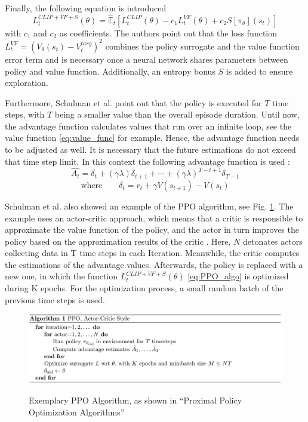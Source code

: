 Finally, the following equation is introduced
\begin{equation}\label{eq:PPO_algo}
    L_{t}^{CLIP+VF+S}(\theta) = \hat{\mathbb{E}}_{t} \left[ L_{t}^{CLIP}(\theta) - c_{1}L_{t}^{VF}(\theta) + c_{2}S[\pi_{\theta}](s_{t}) \right]
\end{equation}
with $c_{1}$ and $c_{2}$ as coefficients. The authors point out that the loss function \\
$L_{t}^{VF} = (V_{\theta}(s_{t})-V_{t}^{targ})^2$ combines the policy surrogate and the value function error term and is necessary once a neural network shares parameters between policy and value function. Additionally, an entropy bonus $S$ is added to ensure exploration.

Furthermore, Schulman et al. point out that the policy is executed for $T$ time steps, with $T$ being a smaller value than the overall episode duration. Until now, the advantage function calculates values that run over an infinite loop, see the value function \eqref{eq:value_func} for example. Hence, the advantage function needs to be adjusted as well. It is necessary that the future estimations do not exceed that time step limit. In this context the following advantage function is used \cite{scwo17}:
\begin{equation}\label{eq:advantage_func}
    \hat{A_t} = \delta_t+(\gamma \lambda)\delta_{t+1}+ \cdots + (\gamma \lambda)^{T-t+1}\delta_{T-1}
\end{equation}
\begin{equation}\label{eq:advantage_func_delta}
    \textrm{where} \qquad \delta_t = r_t + \gamma V(s_{t+1}) - V(s_t)
\end{equation}

Schulman et al. also showed an example of the PPO algorithm, see Fig. \ref{fig:ppo_algo_code}. The example uses an actor-critic approach, which means that a critic is responsible to approximate the value function of the policy, and the actor in turn improves the policy based on the approximation results of the critic \cite{kots03}. Here, $N$ detonates actors collecting data in T time steps in each Iteration. Meanwhile, the critic computes the estimations of the advantage values. Afterwards, the policy is replaced with a new one, in which the function $L_{t}^{CLIP+VF+S}(\theta)$ \eqref{eq:PPO_algo} is optimized during K epochs. For the optimization process, a small random batch of the previous time steps is used.
\begin{figure}[hpbt]
    \centering
    \includegraphics[width=1\textwidth]{pictures/ppo_algo_code.png}\\
    \caption[Exemplary PPO Algorithm]{Exemplary PPO Algorithm, as shown in ``Proximal Policy Optimization Algorithms'' \cite{scwo17}}\label{fig:ppo_algo_code}
\end{figure}

